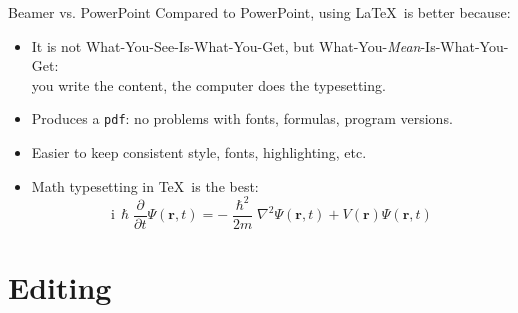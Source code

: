 \documentclass{beamer}
\begin{document}
\begin{frame}{Beamer vs. PowerPoint}
    Compared to PowerPoint, using \LaTeX\ is better because:
    \begin{itemize}
        \item It is not What-You-See-Is-What-You-Get, but What-You-\emph{Mean}-Is-What-You-Get: \\
              you write the content, the computer does the typesetting.
        \item Produces a \texttt{pdf}: no problems with fonts, formulas, program versions.
        \item Easier to keep consistent style, fonts, highlighting, etc.
        \item Math typesetting in \TeX\ is the best:
        \begin{equation*}
            \mathrm i \, \hslash \frac \partial {\partial t} \Psi(\mathbf r, t) = -\frac{\hslash^2}{2m} \nabla^2 \Psi(\mathbf r, t) + V(\mathbf r) \Psi(\mathbf r, t)
        \end{equation*}
    \end{itemize}
\end{frame}

\section{Editing}

\end{document}
